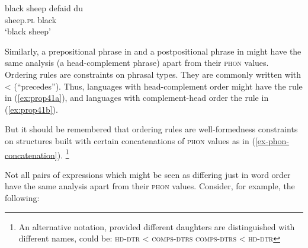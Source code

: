 \documentclass[output=paper
	        ,collection
	        ,collectionchapter
 	        ,biblatex
                ,babelshorthands
                ,newtxmath
                ,draftmode
                ,colorlinks, citecolor=brown
]{langscibook}
\begin{document}
\eal\label{ex:prop40}
\ex\label{ex:prop40a}
black sheep
\ex\label{ex:prop40b}
\gll defaid            du\\
     sheep.\textsc{pl} black\\
\glt `black sheep'
\zl

\noindent
Similarly, a prepositional phrase in  and a postpositional phrase in  might have the same analysis (a head-complement phrase) apart from their \textsc{phon} values. Ordering rules are constraints on phrasal types. They are commonly written with < (``precedes''). Thus, languages with head-complement order might have the rule in (\ref{ex:prop41a}), and languages with complement-head order the rule in (\ref{ex:prop41b}).

\eal\label{ex:prop41}
\ex\label{ex:prop41a}
\ex\label{ex:prop41b}
\zl
%
But it should be remembered that ordering rules are well-formedness constraints on structures built with certain concatenations of \textsc{phon} values as in (\ref{ex-phon-concatenation}).%
%
\footnote{An alternative notation, provided different daughters are distinguished with different names, could be:
\eal
\ex \textsc{hd-dtr} < \textsc{comps-dtrs}
\ex \textsc{comps-dtrs} < \textsc{hd-dtr}
\zllast
}
%

Not all pairs of expressions which might be seen as differing just in word order have the same analysis apart from their \textsc{phon} values. Consider, for example, the following:
\end{document}
